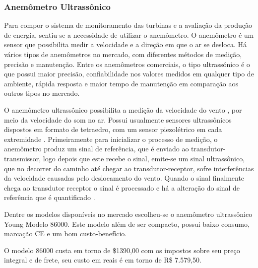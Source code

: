 \subsubsection{Anemômetro Ultrassônico}
  
  Para compor o sistema de monitoramento das turbinas e a avaliação da produção de energia, sentiu-se a necessidade de utilizar
  o anemômetro. O anemômetro é um sensor que possibilita medir a velocidade e a direção em que o ar se desloca. Há vários tipos
  de anemômetros no mercado, com diferentes métodos de medição, precisão e manutenção. Entre os anemômetros comerciais, o tipo
  ultrassónico é o que possui maior precisão, confiabilidade nos valores medidos em qualquer tipo de ambiente, rápida resposta
  e maior tempo de manutenção em comparação aos outros tipos no mercado.
  
  O anemômetro ultrassônico possibilita a medição da velocidade do vento , por meio da velocidade do som no ar. Possui usualmente
  sensores ultrassônicos dispostos em formato de tetraedro, com um sensor piezolétrico em cada extremidade \cite{ribeiro06}.
  Primeiramente para inicializar o processo de medição, o anemômetro produz um sinal de referência, que é enviado ao 
  transdutor-transmissor, logo depois que este recebe o sinal, emite-se um sinal ultrassônico, que no decorrer do caminho até 
  chegar ao transdutor-receptor, sofre interferências da velocidade causadas pelo deslocamento do vento. Quando o sinal finalmente
  chega ao transdutor receptor o sinal é processado e há a alteração do sinal de referência que é quantificado \cite{pereira07}.
  
  Dentre os modelos disponíveis no mercado escolheu-se o anemômetro ultrassônico Young Modelo 86000.
  Este modelo além de ser compacto, possui baixo consumo, marcação CE e um bom custo-benefício.
  
  O modelo 86000 custa em torno de \$1390,00 com os impostos sobre seu preço integral e de frete, seu custo em reais
  é em torno de R\$ 7.579,50.
  
